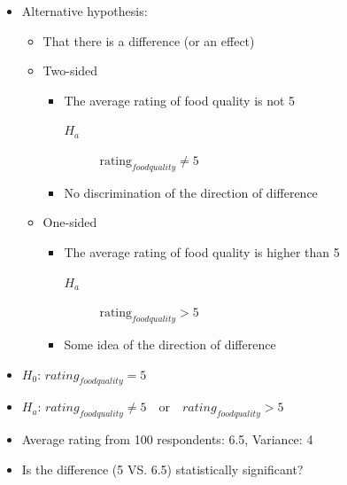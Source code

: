 \documentclass[10pt,article]{article}
\begin{document}
\begin{itemize}
\item Alternative hypothesis: 

\begin{itemize}
\item That there is a difference (or an effect)
\end{itemize}

\begin{multicols}{2}

\begin{itemize}
\item Two-sided
\begin{itemize}
\item The average rating of food quality is not 5

\begin{description}
\item[{\(H_{a}\)}] \(\text{rating}_{foodquality} \ne 5\)
\end{description}

\item No discrimination of the direction of difference
\end{itemize}

\item One-sided
\begin{itemize}
\item The average rating of food quality is higher than 5
\begin{description}
\item[{\(H_{a}\)}] \(\text{rating}_{foodquality} > 5\)
\end{description}

\item Some idea of the direction of difference
\end{itemize}
\end{itemize}

\end{multicols}
\end{itemize}

\begin{itemize}
\item \(H_0\): \(rating_{foodquality} = 5\)
\item \(H_a\): \(rating_{foodquality} \ne 5 \quad \text{or} \quad
  rating_{foodquality} > 5\)
\item Average rating from 100 respondents: 6.5, Variance: 4
\item Is the difference (5 VS. 6.5) statistically significant?
\end{itemize}
\end{document}
